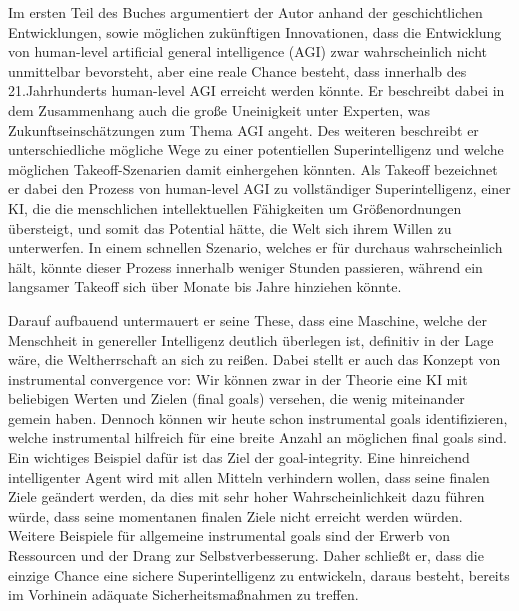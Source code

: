 \documentclass[twoside, a4paper, DIV=11, open=any, bibliography=totoc]{scrbook}
\newcommand{\Quote}[1]{\glqq #1\grqq{}}
\begin{document}
Im ersten Teil des Buches argumentiert der Autor anhand der geschichtlichen Entwicklungen,
sowie möglichen zukünftigen Innovationen, dass die Entwicklung von human-level artificial
general intelligence (AGI) zwar wahrscheinlich nicht unmittelbar bevorsteht, aber
eine reale Chance besteht, dass innerhalb des 21.Jahrhunderts human-level AGI
erreicht werden könnte. Er beschreibt dabei in dem Zusammenhang auch die große
Uneinigkeit unter Experten, was Zukunftseinschätzungen zum Thema AGI angeht.
Des weiteren beschreibt er unterschiedliche mögliche Wege zu einer potentiellen
Superintelligenz und welche möglichen \Quote{Takeoff}-Szenarien damit einhergehen könnten.
Als \Quote{Takeoff} bezeichnet er dabei den Prozess von human-level AGI zu
vollständiger Superintelligenz, einer KI, die die menschlichen intellektuellen Fähigkeiten
um Größenordnungen übersteigt, und somit das Potential hätte, die Welt sich ihrem
Willen zu unterwerfen. In einem schnellen Szenario, welches er für durchaus
wahrscheinlich hält, könnte dieser Prozess innerhalb
weniger Stunden passieren, während ein langsamer \Quote{Takeoff} sich über Monate
bis Jahre hinziehen könnte.

Darauf aufbauend untermauert er seine These, dass eine Maschine, welche der Menschheit
in genereller Intelligenz deutlich überlegen ist, definitiv in der Lage wäre,
die Weltherrschaft an sich zu reißen. Dabei stellt er auch das Konzept von
\Quote{instrumental convergence} vor: Wir können zwar in der Theorie eine KI
mit beliebigen Werten und Zielen (\Quote{final goals}) versehen, die wenig miteinander gemein haben.
Dennoch können wir heute schon \Quote{instrumental goals} identifizieren, welche
instrumental hilfreich für eine breite Anzahl an möglichen \Quote{final goals} sind.
Ein wichtiges Beispiel dafür ist das Ziel der \Quote{goal-integrity}. Eine hinreichend
intelligenter Agent wird mit allen Mitteln verhindern wollen, dass seine finalen Ziele
geändert werden, da dies mit sehr hoher Wahrscheinlichkeit dazu führen würde,
dass seine momentanen finalen Ziele nicht erreicht werden würden. Weitere Beispiele
für allgemeine \Quote{instrumental goals} sind der Erwerb von Ressourcen und der
Drang zur Selbstverbesserung.
Daher schließt er, dass die einzige Chance eine sichere Superintelligenz zu entwickeln,
daraus besteht, bereits im Vorhinein adäquate Sicherheitsmaßnahmen zu treffen.
\end{document}
